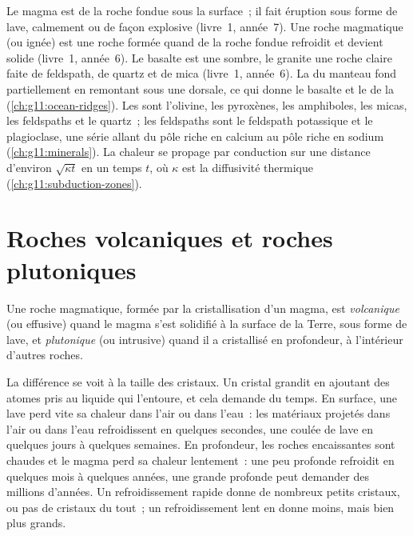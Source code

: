 \begin{recall}
Le magma est de la roche fondue sous la surface~; il fait éruption sous
forme de lave, calmement ou de façon explosive (livre~1, année~7). Une
roche magmatique (ou ignée) est une roche formée quand de la roche fondue
refroidit et devient solide (livre~1, année~6). Le basalte est une  sombre, le granite une roche claire faite de feldspath, de quartz
et de mica (livre~1, année~6). La  du manteau fond partiellement
en remontant sous une dorsale, ce qui donne le basalte et le  de la
 (\cref{ch:g11:ocean-ridges}). Les  sont l'olivine, les pyroxènes, les amphiboles, les micas, les
feldspaths et le quartz~; les feldspaths sont le feldspath potassique et le
plagioclase, une série allant du pôle riche en calcium au pôle riche en
sodium (\cref{ch:g11:minerals}). La chaleur se propage par conduction sur
une distance d'environ $\sqrt{\kappa t}$ en un temps $t$, où $\kappa$ est
la diffusivité thermique (\cref{ch:g11:subduction-zones}).
\end{recall}

\section{Roches volcaniques et roches plutoniques}

\begin{definition}\label{def:g11:igneous-rocks:volcanic-plutonic}
Une roche magmatique, formée par la cristallisation d'un magma, est
\emph{volcanique}
(ou effusive) quand le magma s'est solidifié à la surface de la Terre, sous
forme de lave, et \emph{plutonique} (ou intrusive)
quand il a cristallisé en profondeur, à l'intérieur d'autres roches.
\end{definition}

La différence se voit à la taille des cristaux. Un cristal grandit en
ajoutant des atomes pris au liquide qui l'entoure, et cela demande du temps.
En surface, une lave perd vite sa chaleur dans l'air ou dans l'eau~: les
matériaux projetés dans l'air ou dans l'eau refroidissent en quelques
secondes, une coulée de lave en quelques jours à quelques semaines. En
profondeur, les roches encaissantes sont chaudes et le magma perd sa chaleur
lentement~: une  peu profonde refroidit en quelques mois à quelques
années, une grande  profonde peut demander des millions d'années.
Un refroidissement rapide donne de nombreux petits cristaux, ou pas de
cristaux du tout~; un refroidissement lent en donne moins, mais bien plus
grands.

